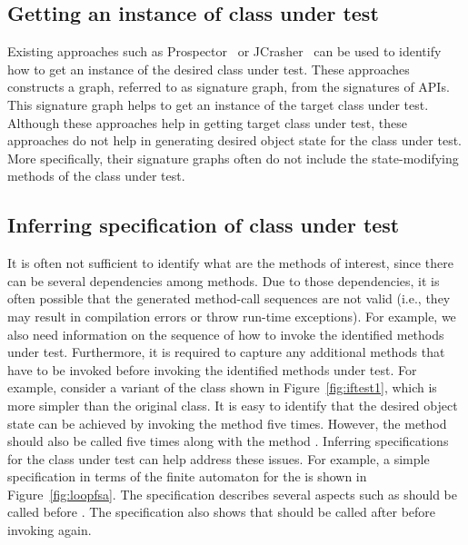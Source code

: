 \subsection{Getting an instance of class under test}

Existing approaches such as Prospector~\cite{prospector:jungloid} or JCrasher~\cite{csallner:jcrasher} can be used to identify how to get an instance of the desired class under test. These approaches constructs a graph, referred to as signature graph, from the signatures of APIs. This signature graph helps to get an instance of the target class under test. Although these approaches help in getting target class under test, these approaches do not help in generating desired object state for the class under test. More specifically, their signature graphs often do not include the state-modifying methods of the class under test.

\subsection{Inferring specification of class under test}

It is often not sufficient to identify what are the methods of interest, since there can be several dependencies among methods. Due to those dependencies, it is often possible that the generated method-call sequences are not valid (i.e., they may result in compilation errors or throw run-time exceptions). For example, we also need information on the sequence of how to invoke the identified methods under test. Furthermore, it is required to capture any additional methods that have to be invoked before invoking the identified methods under test. For example, consider a variant of the class  shown in Figure~\ref{fig:iftest1}, which is more simpler than the original class. It is easy to identify that the desired object state can be achieved by invoking the method  five times. However, the method  should also be called five times along with the method . Inferring specifications for the class under test can help address these issues. For example, a simple specification in terms of the finite automaton for the  is shown in Figure~\ref{fig:loopfsa}. The specification describes several aspects such as  should be called before . The specification also shows that  should be called after  before invoking  again.

